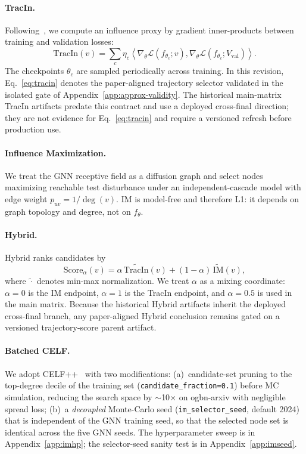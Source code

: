 \paragraph{TracIn.}
Following~\cite{pruthi2020estimating}, we compute an influence proxy by
gradient inner-products between training and validation losses:
\begin{equation}
\label{eq:tracin}
\mathrm{TracIn}(v)=
\sum_c \eta_c
\left\langle
\nabla_\theta\mathcal{L}(f_{\theta_c};v),
\nabla_\theta\mathcal{L}(f_{\theta_c};V_{\mathrm{val}})
\right\rangle .
\end{equation}
The checkpoints $\theta_c$ are sampled periodically across training.  In this
revision, Eq.~\eqref{eq:tracin} denotes the paper-aligned trajectory selector
validated in the isolated gate of Appendix~\ref{app:approx-validity}.  The
historical main-matrix TracIn artifacts predate this contract and use a
deployed cross-final direction; they are not evidence for
Eq.~\eqref{eq:tracin} and require a versioned refresh before production use.

\paragraph{Influence Maximization.}
We treat the GNN receptive field as a diffusion graph and select nodes
maximizing reachable test disturbance under an independent-cascade model
with edge weight $p_{uv}=1/\deg(v)$. IM is model-free and therefore L1:
it depends on graph topology and degree, not on $f_\theta$.

\paragraph{Hybrid.}
Hybrid ranks candidates by
\begin{equation}
\label{eq:hybrid}
\mathrm{Score}_\alpha(v)
=\alpha\,\widetilde{\mathrm{TracIn}}(v)
 +(1-\alpha)\,\widetilde{\mathrm{IM}}(v),
\end{equation}
where $\widetilde{\cdot}$ denotes min-max normalization. We treat
$\alpha$ as a mixing coordinate: $\alpha=0$ is the IM endpoint,
$\alpha=1$ is the TracIn endpoint, and $\alpha=0.5$ is used in the main
matrix.  Because the historical Hybrid artifacts inherit the deployed
cross-final branch, any paper-aligned Hybrid conclusion remains gated on a
versioned trajectory-score parent artifact.

\paragraph{Batched CELF.}
We adopt CELF++~\cite{goyal2011celf++} with two modifications:
(a)~candidate-set pruning to the top-degree decile of the training set
(\texttt{candidate\_fraction=0.1}) before MC simulation, reducing the
search space by $\sim$10$\times$ on ogbn-arxiv with negligible spread loss;
(b)~a \emph{decoupled} Monte-Carlo seed
(\texttt{im\_selector\_seed}, default 2024) that is independent of the
GNN training seed, so that the selected node set is identical across the
five GNN seeds. The hyperparameter sweep is in
Appendix~\ref{app:imhp}; the selector-seed sanity test is in
Appendix~\ref{app:imseed}.

